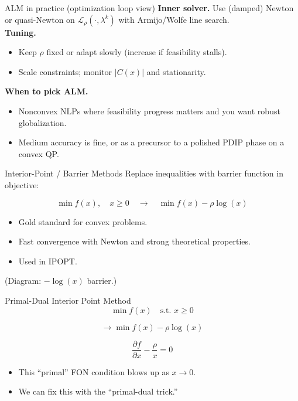 \begin{frame}{ALM in practice (optimization loop view)}
\textbf{Inner solver.} Use (damped) Newton or quasi-Newton on $\mathcal{L}_\rho(\cdot,\lambda^k)$ with Armijo/Wolfe line search. \\
\textbf{Tuning.}
\begin{itemize}
\item Keep $\rho$ fixed or adapt slowly (increase if feasibility stalls).
\item Scale constraints; monitor $|C(x)|$ and stationarity.
\end{itemize}
\textbf{When to pick ALM.}
\begin{itemize}
\item Nonconvex NLPs where feasibility progress matters and you want robust globalization.
\item Medium accuracy is fine, or as a precursor to a polished PDIP phase on a convex QP.
\end{itemize}

\end{frame}









\begin{frame}{Interior-Point / Barrier Methods}
Replace inequalities with barrier function in objective:

$$
\min f(x), \quad x \geq 0 \quad \to \quad \min f(x) - \rho \log(x)
$$

\begin{itemize} 
    \item Gold standard for convex problems.
    \item Fast convergence with Newton and strong theoretical properties.
    \item Used in IPOPT.
\end{itemize} 

(Diagram: $-\log(x)$ barrier.)
    
\end{frame}



\begin{frame}{Primal-Dual Interior Point Method}
$$
\min f(x) \quad \text{s.t. } x \geq 0
$$

$$
\to \min f(x) - \rho \log(x)
$$

$$
\frac{\partial f}{\partial x} - \frac{\rho}{x} = 0
$$

\begin{itemize}
    \item This “primal” FON condition blows up as $x \to 0$.
    \item We can fix this with the “primal-dual trick.”
\end{itemize}
\end{frame}  


